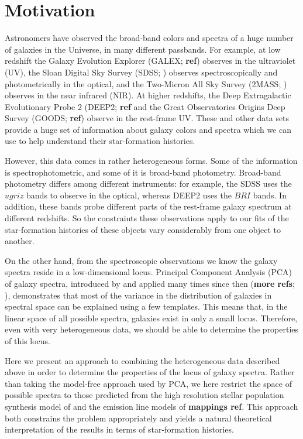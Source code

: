 \documentclass[10pt,preprint]{aastex}
\begin{document}
\section{Motivation}
\label{motivation}

Astronomers have observed the broad-band colors and spectra of a huge
number of galaxies in the Universe, in many different passbands.  For
example, at low redshift the Galaxy Evolution Explorer (GALEX; {\bf
ref}) observes in the ultraviolet (UV), the Sloan Digital Sky Survey
(SDSS; \citealt{york00a}) observes spectroscopically and
photometrically in the optical, and the Two-Micron All Sky Survey
(2MASS; \citealt{strutskie97a}) observes in the near infrared
(NIR). At higher redshifts, the Deep Extragalactic Evolutionary Probe
2 (DEEP2; {\bf ref} and the Great Observatories Origins Deep Survey
(GOODS; {\bf ref}) observe in the rest-frame UV. These and other data
sets provide a huge set of information about galaxy colors and spectra
which we can use to help understand their star-formation histories.

However, this data comes in rather heterogeneous forms. Some of the
information is spectrophotometric, and some of it is broad-band
photometry. Broad-band photometry differs among different instruments:
for example, the SDSS uses the $ugriz$ bands to observe in the
optical, whereas DEEP2 uses the $BRI$ bands. In addition, these bands
probe different parts of the rest-frame galaxy spectrum at different
redshifts. So the constraints these observations apply to our fits of
the star-formation histories of these objects vary considerably from
one object to another.

On the other hand, from the spectroscopic observations we know the
galaxy spectra reside in a low-dimensional locus. Principal Component
Analysis (PCA) of galaxy spectra, introduced by \citet{connolly94a}
and applied many times since then ({\bf more refs}; \citealt{yip05a}),
demonstrates that most of the variance in the distribution of galaxies
in spectral space can be explained using a few templates. This means
that, in the linear space of all possible spectra, galaxies exist in
only a small locus. Therefore, even with very heterogeneous data, we
should be able to determine the properties of this locus.

Here we present an approach to combining the heterogeneous data
described above in order to determine the properties of the locus of
galaxy spectra. Rather than taking the model-free approach used by
PCA, we here restrict the space of possible spectra to those predicted
from the high resolution stellar population synthesis model of
\citet{bruzual03a} and the emission line models of {\bf mappings
ref}.  This approach both constrains the problem appropriately and
yields a natural theoretical interpretation of the results in terms of
star-formation histories.
\end{document}
